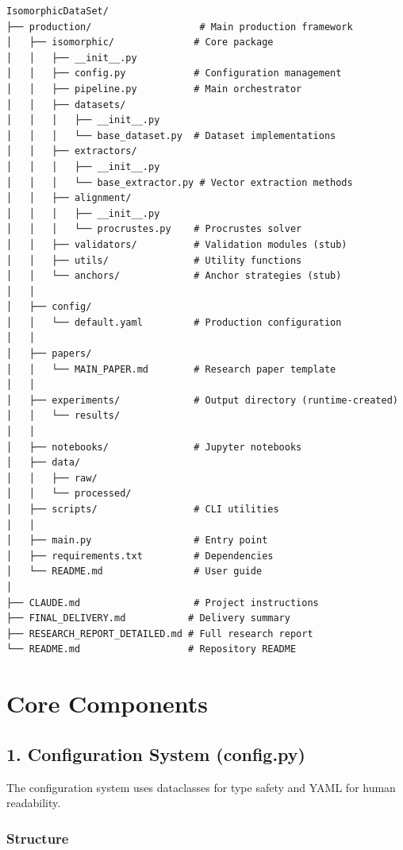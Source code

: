 \documentclass[12pt,a4paper,oneside]{report}
\begin{document}
\begin{lstlisting}[caption=Complete Directory Structure]
IsomorphicDataSet/
├── production/                   # Main production framework
│   ├── isomorphic/              # Core package
│   │   ├── __init__.py
│   │   ├── config.py            # Configuration management
│   │   ├── pipeline.py          # Main orchestrator
│   │   ├── datasets/
│   │   │   ├── __init__.py
│   │   │   └── base_dataset.py  # Dataset implementations
│   │   ├── extractors/
│   │   │   ├── __init__.py
│   │   │   └── base_extractor.py # Vector extraction methods
│   │   ├── alignment/
│   │   │   ├── __init__.py
│   │   │   └── procrustes.py    # Procrustes solver
│   │   ├── validators/          # Validation modules (stub)
│   │   ├── utils/               # Utility functions
│   │   └── anchors/             # Anchor strategies (stub)
│   │
│   ├── config/
│   │   └── default.yaml         # Production configuration
│   │
│   ├── papers/
│   │   └── MAIN_PAPER.md        # Research paper template
│   │
│   ├── experiments/             # Output directory (runtime-created)
│   │   └── results/
│   │
│   ├── notebooks/               # Jupyter notebooks
│   ├── data/
│   │   ├── raw/
│   │   └── processed/
│   ├── scripts/                 # CLI utilities
│   │
│   ├── main.py                  # Entry point
│   ├── requirements.txt         # Dependencies
│   └── README.md                # User guide
│
├── CLAUDE.md                    # Project instructions
├── FINAL_DELIVERY.md           # Delivery summary
├── RESEARCH_REPORT_DETAILED.md # Full research report
└── README.md                   # Repository README
\end{lstlisting}

\section{Core Components}

\subsection{1. Configuration System (config.py)}

The configuration system uses dataclasses for type safety and YAML for human readability.

\subsubsection{Structure}
\end{document}
